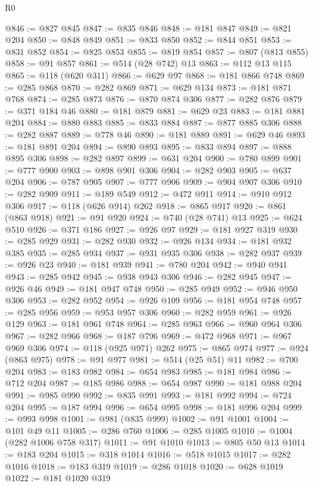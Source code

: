\begin{lexlean}{R0}
\begin{coremodule}
@846 := @827 @845
@847 := @835 @846
@848 := @181 @847
@849 := @821 @204
@850 := @848 @849
@851 := @833 @850
@852 := @844 @851
@853 := @831 @852
@854 := @825 @853
@855 := @819 @854
@857 := @807 (@813 @855)
@858 := @91 @857
@861 := @514 (@28 @742) @13
@863 := @112 @13 @115
@865 := @118 (@620 @311)
@866 := @629 @97
@868 := @181 @866 @748
@869 := @285 @868
@870 := @282 @869
@871 := @629 @134
@873 := @181 @871 @768
@874 := @285 @873
@876 := @870 @874 @306
@877 := @282 @876
@879 := @371 @184 @46
@880 := @181 @879
@881 := @629 @23
@883 := @181 @881 @204
@884 := @880 @883
@885 := @833 @884
@887 := @877 @885 @306
@888 := @282 @887
@889 := @778 @46
@890 := @181 @889
@891 := @629 @46
@893 := @181 @891 @204
@894 := @890 @893
@895 := @833 @894
@897 := @888 @895 @306
@898 := @282 @897
@899 := @631 @204
@900 := @780 @899
@901 := @777 @900
@903 := @898 @901 @306
@904 := @282 @903
@905 := @637 @204
@906 := @787 @905
@907 := @777 @906
@909 := @904 @907 @306
@910 := @282 @909
@911 := @189 @549
@912 := @472 @911
@914 := @910 @912 @306
@917 := @118 (@626 @914) @262
@918 := @865 @917
@920 := @861 (@863 @918)
@921 := @91 @920
@924 := @740 (@28 @741) @13
@925 := @624 @510
@926 := @371 @186
@927 := @926 @97
@929 := @181 @927 @319
@930 := @285 @929
@931 := @282 @930
@932 := @926 @134
@934 := @181 @932 @385
@935 := @285 @934
@937 := @931 @935 @306
@938 := @282 @937
@939 := @926 @23
@940 := @181 @939
@941 := @780 @204
@942 := @940 @941
@943 := @285 @942
@945 := @938 @943 @306
@946 := @282 @945
@947 := @926 @46
@949 := @181 @947 @748
@950 := @285 @949
@952 := @946 @950 @306
@953 := @282 @952
@954 := @926 @109
@956 := @181 @954 @748
@957 := @285 @956
@959 := @953 @957 @306
@960 := @282 @959
@961 := @926 @129
@963 := @181 @961 @748
@964 := @285 @963
@966 := @960 @964 @306
@967 := @282 @966
@968 := @187 @796
@969 := @472 @968
@971 := @967 @969 @306
@974 := @118 (@925 @971) @262
@975 := @865 @974
@977 := @924 (@863 @975)
@978 := @91 @977
@981 := @514 (@25 @51) @11
@982 := @700 @204
@983 := @183 @982
@984 := @654 @983
@985 := @181 @984
@986 := @712 @204
@987 := @185 @986
@988 := @654 @987
@990 := @181 @988 @204
@991 := @985 @990
@992 := @835 @991
@993 := @181 @992
@994 := @724 @204
@995 := @187 @994
@996 := @654 @995
@998 := @181 @996 @204
@999 := @993 @998
@1001 := @981 (@835 @999)
@1002 := @91 @1001
@1004 := @101 @49 @11
@1005 := @286 @760
@1006 := @285 @1005
@1010 := @1004 (@282 @1006 @758 @317)
@1011 := @91 @1010
@1013 := @805 @50 @13
@1014 := @183 @204
@1015 := @318 @1014
@1016 := @518 @1015
@1017 := @282 @1016
@1018 := @183 @319
@1019 := @286 @1018
@1020 := @628 @1019
@1022 := @181 @1020 @319

\end{coremodule}
\end{lexlean}
